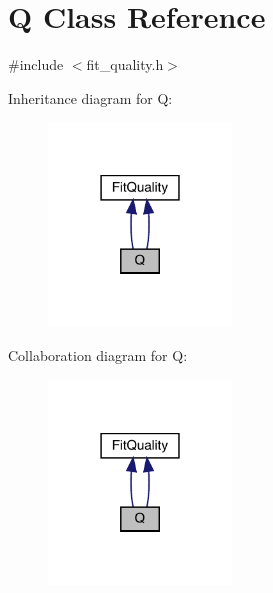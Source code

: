 \hypertarget{classQ}{}\section{Q Class Reference}
\label{classQ}


{\ttfamily \#include $<$fit\+\_\+quality.\+h$>$}



Inheritance diagram for Q\+:
\nopagebreak
\begin{figure}[H]
\begin{center}
\leavevmode
\includegraphics[width=138pt]{d2/d1d/classQ__inherit__graph}
\end{center}
\end{figure}


Collaboration diagram for Q\+:
\nopagebreak
\begin{figure}[H]
\begin{center}
\leavevmode
\includegraphics[width=138pt]{d5/d9e/classQ__coll__graph}
\end{center}
\end{figure}

